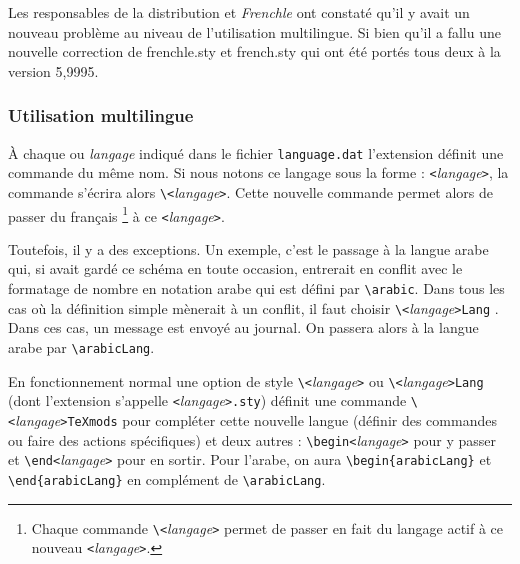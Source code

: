\documentclass[a4paper,12pt,openright]{article}
\begin{document}
Les responsables de la distribution \textsl{\befr} et {\sl Frenchle} ont constaté qu'il y avait un nouveau
problème au niveau de l'utilisation multilingue. Si bien qu'il a 
fallu une nouvelle correction de frenchle.sty et french.sty qui ont été portés tous deux à la version 5,9995.

\subsubsection{Utilisation multilingue}\label{multilingue}
%
À chaque ou {\em langage}
 indiqué dans le fichier 
\verb|language.dat| l'extension \textsl{\befr} définit une commande du
même nom. Si nous notons ce langage sous la forme : 
\verb|<|{\em langage}\verb|>|,
la commande s'écrira alors \verb|\<|{\em langage}\verb|>|.
Cette nouvelle commande permet alors de passer du français%
\footnote{Chaque commande \texttt{\backslash\string<}{\em langage}\texttt{\string>} 
permet de passer en fait du langage actif à ce nouveau 
\texttt{\string<}{\em langage}\texttt{\string>}.} 
 à ce \verb|<|{\em langage}\verb|>|. 


Toutefois, il y a des exceptions. Un exemple, c'est le passage  à la langue arabe qui, si \textsl{\befr}
avait gardé ce schéma en toute occasion, entrerait en conflit avec le formatage de nombre
en notation arabe qui est défini par \verb|\arabic|. Dans tous les cas où la définition simple 
mènerait à un conflit, il faut choisir \verb|\<|{\em langage}\verb|>Lang| 
. %
Dans ces cas, un message est envoyé au journal.
On passera alors à la 
langue arabe par \verb|\arabicLang|. 

En fonctionnement normal une option de style \verb|\<|{\em langage}\verb|>| 
ou \verb|\<|{\em langage}{\tt>Lang{}}
(dont l'extension s'appelle %
%
\verb|<|{\em lan\-gage}\verb|>|\texttt{.sty}) 
définit une commande \verb|\<|{\em langage}\verb|>TeXmods|
% 
% 
pour compléter cette nouvelle langue (définir des commandes 
ou faire des actions spécifiques) 
et deux autres : \verb|\begin<|\emph{langage}\verb|>| pour y passer
et \verb|\end<|\emph{langage}\verb|>| pour
en sortir. 
Pour l'arabe, on aura \verb|\begin{arabicLang}| et \verb|\end{arabicLang}|
en complément de \verb|\arabicLang|. 
\end{document}
